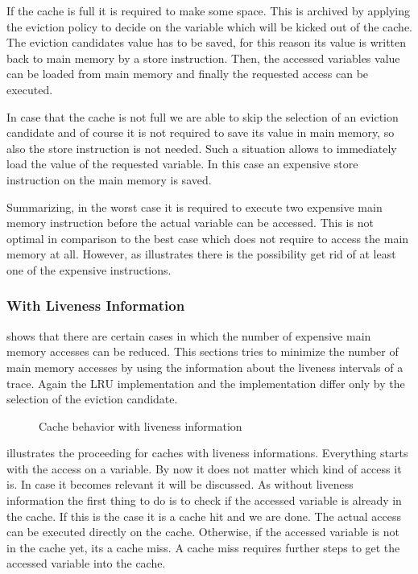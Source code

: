 \documentclass[onecolumn, openright, master, english, signatures]{dbrgrptt}
\begin{document}
If the cache is full it is required to make some space. This is archived by applying the eviction policy to decide on the variable which will be kicked out of the cache. The eviction candidates value has to be saved, for this reason its value is written back to main memory by a store instruction. Then, the accessed variables value can be loaded from main memory and finally the requested access can be executed.

In case that the cache is not full we are able to skip the selection of an eviction candidate and of course it is not required to save its value in main memory, so also the store instruction is not needed. Such a situation allows to immediately load the value of the requested variable. In this case an expensive store instruction on the main memory is saved.

Summarizing, in the worst case it is required to execute two expensive main memory instruction before the actual variable can be accessed. This is not optimal in comparison to the best case which does not require to access the main memory at all. However, as  illustrates there is the possibility get rid of at least one of the expensive instructions.

\subsubsection{With Liveness Information}\label{ssec:cache-behavior-liveness}

 shows that there are certain cases in which the number of expensive main memory accesses can be reduced. This sections tries to minimize the number of main memory accesses by using the information about the liveness intervals of a \ac{trace}. Again the \ac{LRU} implementation and the  implementation differ only by the selection of the eviction candidate.

\begin{figure}[!ht]
  \centering
  \scalebox{0.8}{}
  \caption{Cache behavior with liveness information}
  \label{fig:cache-behavior-liveness}
\end{figure}

 illustrates the proceeding for caches with liveness informations. Everything starts with the access on a variable. By now it does not matter which kind of access it is. In case it becomes relevant it will be discussed. As without liveness information the first thing to do is to check if the accessed variable is already in the cache. If this is the case it is a cache hit and we are done. The actual access can be executed directly on the cache.
Otherwise, if the accessed variable is not in the cache yet, its a cache miss. A cache miss requires further steps to get the accessed variable into the cache.
\end{document}

